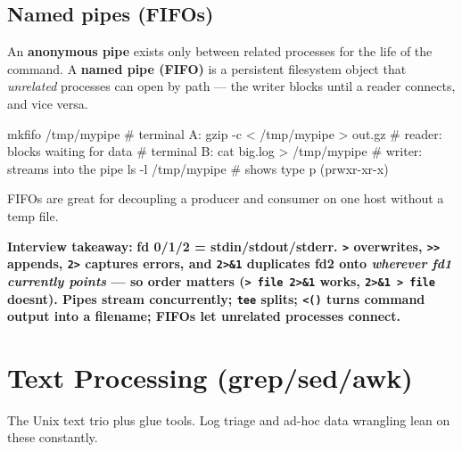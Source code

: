 \documentclass[11pt]{article}
\newenvironment{Shaded}{\begin{snugshade}}{\end{snugshade}}
\newcommand{\AttributeTok}[1]{\textcolor[rgb]{0.16,0.50,0.73}{#1}}
\newcommand{\CommentTok}[1]{\textcolor[rgb]{0.48,0.49,0.49}{#1}}
\newcommand{\FunctionTok}[1]{\textcolor[rgb]{0.56,0.27,0.68}{#1}}
\newcommand{\NormalTok}[1]{\textcolor[rgb]{0.81,0.81,0.76}{#1}}
\newcommand{\OperatorTok}[1]{\textcolor[rgb]{0.81,0.81,0.76}{#1}}
\begin{document}
\subsection{Named pipes (FIFOs)}\label{named-pipes-fifos}

An \textbf{anonymous pipe} exists only between related processes for the life of the command. A \textbf{named pipe (FIFO)} is a persistent filesystem object that \emph{unrelated} processes can open by path --- the writer blocks until a reader connects, and vice versa.


\begin{Shaded}
\begin{Highlighting}[]
\FunctionTok{mkfifo}\NormalTok{ /tmp/mypipe}
\CommentTok{\# terminal A:}
\FunctionTok{gzip} \AttributeTok{{-}c} \OperatorTok{\textless{}}\NormalTok{ /tmp/mypipe }\OperatorTok{\textgreater{}}\NormalTok{ out.gz     }\CommentTok{\# reader: blocks waiting for data}
\CommentTok{\# terminal B:}
\FunctionTok{cat}\NormalTok{ big.log }\OperatorTok{\textgreater{}}\NormalTok{ /tmp/mypipe          }\CommentTok{\# writer: streams into the pipe}
\FunctionTok{ls} \AttributeTok{{-}l}\NormalTok{ /tmp/mypipe                  }\CommentTok{\# shows type \textquotesingle{}p\textquotesingle{}  (prwxr{-}xr{-}x)}
\end{Highlighting}
\end{Shaded}

FIFOs are great for decoupling a producer and consumer on one host without a temp file.

\textbf{Interview takeaway:} \textbf{fd 0/1/2 = stdin/stdout/stderr. \texttt{\textgreater{}} overwrites, \texttt{\textgreater{}\textgreater{}} appends, \texttt{2\textgreater{}} captures errors, and \texttt{2\textgreater{}\&1} duplicates fd2 onto \emph{wherever fd1 currently points} --- so order matters (\texttt{\textgreater{}\ file\ 2\textgreater{}\&1} works, \texttt{2\textgreater{}\&1\ \textgreater{}\ file} doesn\textquotesingle t). Pipes stream concurrently; \texttt{tee} splits; \texttt{\textless{}()} turns command output into a filename; FIFOs let unrelated processes connect.}

\section{Text Processing (grep/sed/awk)}\label{text-processing-grepsedawk}

The Unix text trio plus glue tools. Log triage and ad-hoc data wrangling lean on these constantly.
\end{document}
